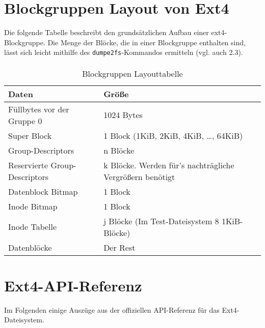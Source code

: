 \documentclass[11pt,a4paper]{article}
\def\inlinebash{\lstinline[style=bash]}
\begin{document}
\section{Blockgruppen Layout von Ext4}
Die folgende Tabelle beschreibt den grundsätzlichen Aufbau einer ext4-Blockgruppe.
Die Menge der Blöcke, die in einer Blockgruppe enthalten sind, lässt sich leicht
mithilfe des \inlinebash$dumpe2fs$-Kommandos ermitteln (vgl. auch 2.3).
\paragraph{}

\begin{table}[h]
	\begin{center}
		\begin{tabular}[c]{| l | l |}
			\hline
			\cellcolor{grey} Daten & \cellcolor{grey} Größe \\ \hline
			Füllbytes vor der Gruppe 0 & 1024 Bytes \\ \hline
			Super Block & 1 Block (1KiB, 2KiB, 4KiB, \ldots, 64KiB) \\ \hline
			Group-Descriptors & n Blöcke  \\ \hline
			Reservierte Group-Descriptors & k Blöcke. Werden für's nachträgliche Vergrößern benötigt \\ \hline
			Datenblock Bitmap & 1 Block \\ \hline
			Inode Bitmap & 1 Block \\ \hline
			Inode Tabelle & j Blöcke (Im Test-Dateisystem 8 1KiB-Blöcke) \\ \hline
			Datenblöcke & Der Rest \\ \hline
		
		\end{tabular}
	\end{center}

	\caption{Blockgruppen Layouttabelle}
	\label{tab:block_layout}
\end{table}

\section{Ext4-API-Referenz}
Im Folgenden einige Auszüge aus der offiziellen API-Referenz für das
Ext4-Dateisystem.
\end{document}

